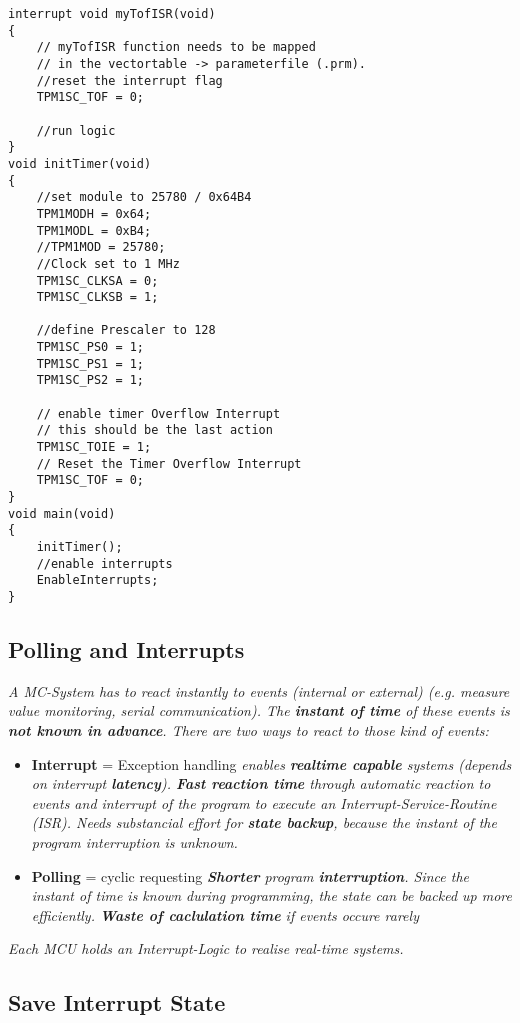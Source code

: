 \begin{lstlisting}
interrupt void myTofISR(void)
{
    // myTofISR function needs to be mapped
    // in the vectortable -> parameterfile (.prm).
    //reset the interrupt flag
    TPM1SC_TOF = 0;

    //run logic
}
void initTimer(void)
{
    //set module to 25780 / 0x64B4
    TPM1MODH = 0x64;
    TPM1MODL = 0xB4;
    //TPM1MOD = 25780;
    //Clock set to 1 MHz
    TPM1SC_CLKSA = 0;
    TPM1SC_CLKSB = 1;

    //define Prescaler to 128
    TPM1SC_PS0 = 1;
    TPM1SC_PS1 = 1;
    TPM1SC_PS2 = 1;

    // enable timer Overflow Interrupt
    // this should be the last action
    TPM1SC_TOIE = 1;
    // Reset the Timer Overflow Interrupt
    TPM1SC_TOF = 0;
}
void main(void)
{
    initTimer();
    //enable interrupts
    EnableInterrupts;
}
\end{lstlisting}

\subsection{Polling and Interrupts}

\textit{
    A MC-System has to react instantly to events (internal or external)
    (e.g. measure value monitoring, serial communication).\newline
    The \textbf{instant of time} of these events is \textbf{not known in advance}. \newline
    There are two ways to react to those kind of events: \newline
}

\begin{itemize}
    \item{
        \textbf{Interrupt} = Exception handling \newline
        \textit{
            enables \textbf{realtime capable} systems (depends on interrupt
            \textbf{latency}). \textbf{Fast reaction time} through automatic reaction
            to events and interrupt of the program to execute an
            Interrupt-Service-Routine (ISR). \newline
            Needs substancial effort for \textbf{state backup}, because the instant of
            the program interruption is unknown.
        }
    }
    \item {
        \textbf{Polling} = cyclic requesting \newline
        \textit{
            \textbf{Shorter} program \textbf{interruption}. Since the instant of time is
            known during programming, the state can be backed up more efficiently. \newline
            \textbf{Waste of caclulation time} if events occure rarely
        }
    }
\end{itemize}

\textit{
    \newline
    Each MCU holds an Interrupt-Logic to realise real-time systems.
}

\subsection{Save Interrupt State}

